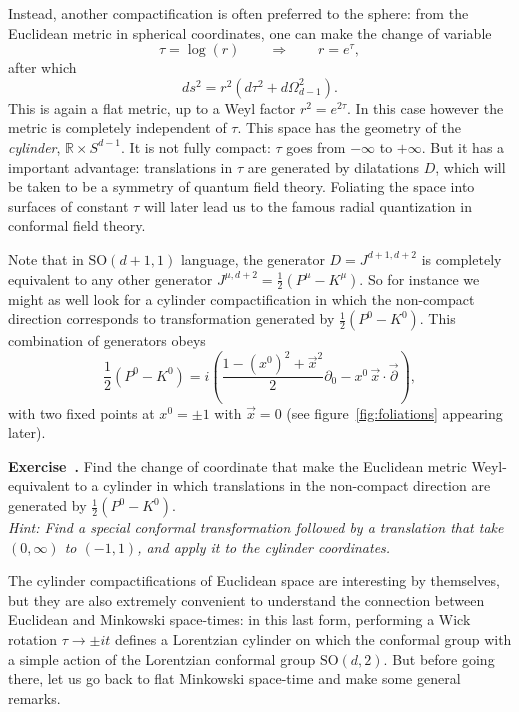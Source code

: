 \documentclass[a4paper,12pt]{article}
\newcommand{\SO}{\text{SO}}
\numberwithin{equation}{section}
\newcounter{exercise}[section]
\newenvironment{exercise}[1][]%
	{\refstepcounter{exercise}\bigskip
	\begin{mdframed}[backgroundcolor=gray!20, linewidth=0]
	\noindent\textbf{Exercise~\thesection.\theexercise #1} \rmfamily}
  	{\end{mdframed}\bigskip}
\newcommand\hint[1]{\emph{Hint: #1}}
\begin{document}
Instead, another compactification is often preferred to the sphere: from the Euclidean metric in spherical coordinates, one can make the change of variable
\begin{equation}
	\tau = \log(r)
	\qquad\Rightarrow\qquad
	r = e^\tau,
\end{equation}
after which
\begin{equation}
	ds^2 = r^2 \left( d\tau^2 + d\Omega_{d-1}^2 \right).
	\label{eq:cylindercoordinates}
\end{equation}
This is again a flat metric, up to a Weyl factor $r^2 = e^{2\tau}$. In this case however the metric is completely independent of $\tau$.
This space has the geometry of the \emph{cylinder}, $\mathds{R} \times S^{d-1}$. It is not fully compact: $\tau$ goes from $-\infty$ to $+\infty$. But it has a important advantage: translations in $\tau$ are generated by dilatations $D$, which will be taken to be a symmetry of quantum field theory. Foliating the space into surfaces of constant $\tau$ will later lead us to the famous radial quantization in conformal field theory.

Note that in $\SO(d + 1, 1)$ language, the generator $D = J^{d+1, d+2}$ is completely equivalent to any other generator $J^{\mu, d+2} = \frac{1}{2} \left( P^\mu - K^\mu \right)$. So for instance we might as well look for a cylinder compactification in which the non-compact direction corresponds to transformation generated by
$\frac{1}{2} \left( P^0 - K^0 \right)$. This combination of generators obeys
\begin{equation}
	\frac{1}{2} \left( P^0 - K^0 \right)
	= i \left( \frac{1 - (x^0)^2 + \vec{x}^2}{2} \partial_0
	- x^0 \, \vec{x} \cdot \vec{\partial} \right),
\end{equation}
with two fixed points at $x^0 = \pm 1$ with $\vec{x} = 0$ 
(see figure~\ref{fig:foliations} appearing later).

\begin{exercise}
	Find the change of coordinate that make the Euclidean metric Weyl-equivalent to a cylinder in which translations in the non-compact direction are generated by $\frac{1}{2} \left( P^0 - K^0 \right)$. \\
	\hint{Find a special conformal transformation followed by a translation that take $(0, \infty)$ to $(-1, 1)$, and apply it to the cylinder coordinates.}
\end{exercise}

The cylinder compactifications of Euclidean space are interesting by themselves, but they are also extremely convenient to understand the connection between Euclidean and Minkowski space-times: in this last form, performing a Wick rotation $\tau \to \pm i t$ defines a Lorentzian cylinder on which the conformal group with a simple action of the Lorentzian conformal group $\SO(d, 2)$. 
But before going there, let us go back to flat Minkowski space-time and make some general remarks.
\end{document}
